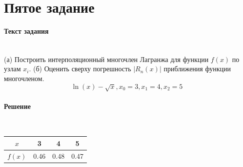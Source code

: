 \section{Пятое задание}

\paragraph{Текст задания} ~\\
(а) Построить интерполяционный многочлен Лагранжа для функции $f(x)$ по узлам $x_{i}$. (б) Оценить сверху погрешность $|R_{n}(x)|$ приближения функции многочленом.\\[2mm]
\[
  \ln(x) - \sqrt{x}, x_{0} = 3, x_{1} = 4, x_{2} = 5
\]

\paragraph{Решение} ~\\

\begin{tabular}{|c | c | c | c|}
  \hline
  $x$ & 3 & 4 & 5 \\
  \hline
  $f(x)$ & 0.46 & 0.48 & 0.47 \\
  \hline
\end{tabular}

